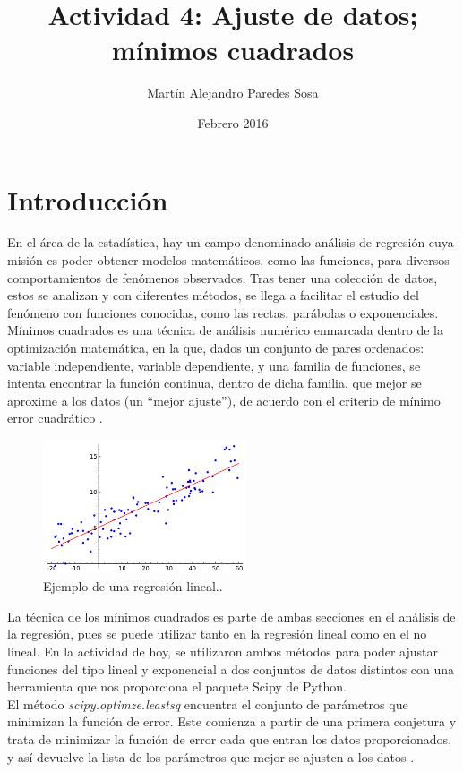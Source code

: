 \documentclass[12pt]{article}
\title{Actividad 4: Ajuste de datos; mínimos cuadrados}
\author{Martín Alejandro Paredes Sosa}
\date{Febrero 2016}
\begin{document}
\maketitle

\section{Introducción}
En el área de la estadística, hay un campo denominado análisis de regresión cuya misión es poder obtener modelos matemáticos, como las funciones, para diversos comportamientos de fenómenos observados. Tras tener una colección de datos, estos se analizan y con diferentes métodos, se llega a facilitar el estudio del fenómeno con funciones conocidas, como las rectas, parábolas o exponenciales.\\

Mínimos cuadrados es una técnica de análisis numérico enmarcada dentro de la optimización matemática, en la que, dados un conjunto de pares ordenados: variable independiente, variable dependiente, y una familia de funciones, se intenta encontrar la función continua, dentro de dicha familia, que mejor se aproxime a los datos (un ``mejor ajuste''), de acuerdo con el criterio de mínimo error cuadrático \cite{Mc}. 

\begin{figure}[H]
\centering
\includegraphics[width=6cm]{AjusteMC.png}
\caption{Ejemplo de una regresión lineal.\cite{a}.}
\end{figure}

La técnica de los mínimos cuadrados es parte de ambas secciones en el análisis de la regresión, pues se puede utilizar tanto en la regresión lineal como en el no lineal. En la actividad de hoy, se utilizaron ambos métodos para poder ajustar funciones del tipo lineal y exponencial a dos conjuntos de datos distintos con una herramienta que nos proporciona el paquete Scipy de Python.\\

El método \textit{scipy.optimze.leastsq} encuentra el conjunto de parámetros que minimizan la función de error. Este comienza a partir de una primera conjetura y trata de minimizar la función de error cada que entran los datos proporcionados, y así devuelve la lista de los parámetros que mejor se ajusten a los datos \cite{Q}. 
\end{document}
